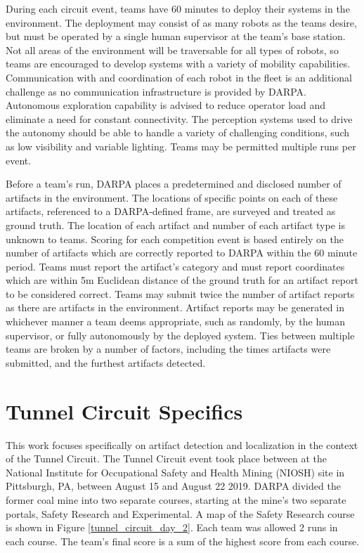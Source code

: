 During each circuit event, teams have 60 minutes to deploy their systems in the environment. The deployment may consist of as many robots as the teams desire, but must be operated by a single human supervisor at the team's base station. Not all areas of the environment will be traversable for all types of robots, so teams are encouraged to develop systems with a variety of mobility capabilities. Communication with and coordination of each robot in the fleet is an additional challenge as no communication infrastructure is provided by DARPA. Autonomous exploration capability is advised to reduce operator load and eliminate a need for constant connectivity. The perception systems used to drive the autonomy should be able to handle a variety of challenging conditions, such as low visibility and variable lighting. Teams may be permitted multiple runs per event.

Before a team's run, DARPA places a predetermined and disclosed number of artifacts in the environment. The locations of specific points on each of these artifacts, referenced to a DARPA-defined frame, are surveyed and treated as ground truth. The location of each artifact and number of each artifact type is unknown to teams. Scoring for each competition event is based entirely on the number of artifacts which are correctly reported to DARPA within the 60 minute period. Teams must report the artifact's category and must report coordinates which are within 5m Euclidean distance of the ground truth for an artifact report to be considered correct. Teams may submit twice the number of artifact reports as there are artifacts in the environment. Artifact reports may be generated in whichever manner a team deems appropriate, such as randomly, by the human supervisor, or fully autonomously by the deployed system. Ties between multiple teams are broken by a number of factors, including the times artifacts were submitted, and the furthest artifacts detected.


\section{Tunnel Circuit Specifics}

This work focuses specifically on artifact detection and localization in the context of the Tunnel Circuit. The Tunnel Circuit event took place between at the National Institute for Occupational Safety and Health Mining (NIOSH) site in Pittsburgh, PA, between August 15 and August 22 2019. DARPA divided the former coal mine into two separate courses, starting at the mine's two separate portals, Safety Research and Experimental. A map of the Safety Research course is shown in Figure \ref{tunnel_circuit_day_2}. Each team was allowed 2 runs in each course. The team's final score is a sum of the highest score from each course.

